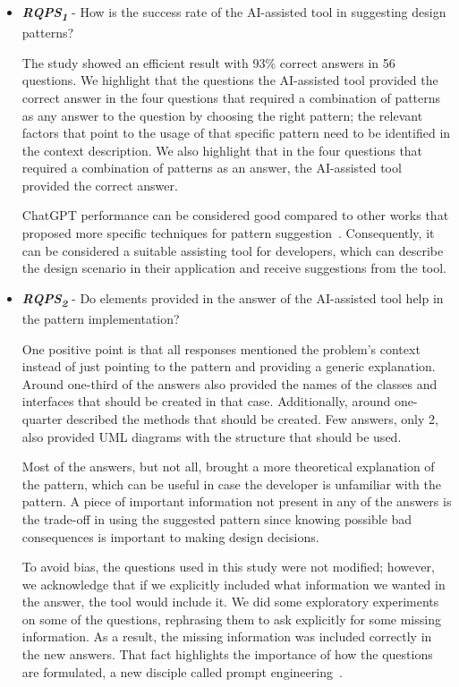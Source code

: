 \begin{itemize}
    \item  \textbf{\textit{RQPS\textsubscript{1}}} - How is the success rate of the AI-assisted tool in suggesting design patterns?\label{sec5sub1}
    
    The study showed an efficient result with 93\% correct answers in 56 questions. We highlight that the questions the AI-assisted tool provided the correct answer in the four questions that required a combination of patterns as any answer to the question by choosing the right pattern; the relevant factors that point to the usage of that specific pattern need to be identified in the context description. We also highlight that in the four questions that required a combination of patterns as an answer, the AI-assisted tool provided the correct answer.

    ChatGPT performance can be considered good compared to other works that proposed more specific techniques for pattern suggestion~\cite{Hussain2019automated, Naghdipour2023Semi}. Consequently, it can be considered a suitable assisting tool for developers, which can describe the design scenario in their application and receive suggestions from the tool.

     \item  \textbf{\textit{RQPS\textsubscript{2}}}  - Do elements provided in the answer of the AI-assisted tool help in the pattern implementation?\label{sec5sub2}

     One positive point is that all responses mentioned the problem's context instead of just pointing to the pattern and providing a generic explanation. Around one-third of the answers also provided the names of the classes and interfaces that should be created in that case. Additionally, around one-quarter described the methods that should be created. Few answers, only 2, also provided UML diagrams with the structure that should be used.

    Most of the answers, but not all, brought a more theoretical explanation of the pattern, which can be useful in case the developer is unfamiliar with the pattern. A piece of important information not present in any of the answers is the trade-off in using the suggested pattern since knowing possible bad consequences is important to making design decisions.
    
    To avoid bias, the questions used in this study were not modified; however, we acknowledge that if we explicitly included what information we wanted in the answer, the tool would include it. We did some exploratory experiments on some of the questions, rephrasing them to ask explicitly for some missing information. As a result, the missing information was included correctly in the new answers. That fact highlights the importance of how the questions are formulated, a new disciple called prompt engineering~\cite{White2023}.  


\end{itemize}

